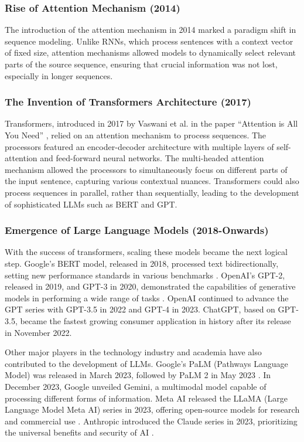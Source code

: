 \subsubsection{Rise of Attention Mechanism (2014)}

The introduction of the attention mechanism in 2014 marked a paradigm shift in sequence modeling. Unlike RNNs, which process sentences with a context vector of fixed size, attention mechanisms allowed models to dynamically select relevant parts of the source sequence, ensuring that crucial information was not lost, especially in longer sequences.

\subsubsection{The Invention of Transformers Architecture (2017)}

Transformers, introduced in 2017 by Vaswani et al. in the paper “Attention is All You Need” \cite{vaswani2017attention}, relied on an attention mechanism to process sequences. The processors featured an encoder-decoder architecture with multiple layers of self-attention and feed-forward neural networks. The multi-headed attention mechanism allowed the processors to simultaneously focus on different parts of the input sentence, capturing various contextual nuances. Transformers could also process sequences in parallel, rather than sequentially, leading to the development of sophisticated LLMs such as BERT and GPT.

\subsubsection{Emergence of Large Language Models (2018-Onwards)}

With the success of transformers, scaling these models became the next logical step. Google's BERT model, released in 2018, processed text bidirectionally, setting new performance standards in various benchmarks \cite{devlin2018bert}. OpenAI's GPT-2, released in 2019, and GPT-3 in 2020, demonstrated the capabilities of generative models in performing a wide range of tasks \cite{radford2019language}. OpenAI continued to advance the GPT series with GPT-3.5 in 2022 and GPT-4 in 2023. ChatGPT, based on GPT-3.5, became the fastest growing consumer application in history after its release in November 2022.

Other major players in the technology industry and academia have also contributed to the development of LLMs. Google's PaLM (Pathways Language Model) was released in March 2023, followed by PaLM 2 in May 2023 \cite{chowdhery2023palm}. In December 2023, Google unveiled Gemini, a multimodal model capable of processing different forms of information. Meta AI released the LLaMA (Large Language Model Meta AI) series in 2023, offering open-source models for research and commercial use \cite{touvron2023llama}. Anthropic introduced the Claude series in 2023, prioritizing the universal benefits and security of AI \cite{anthropic2024claude}.


